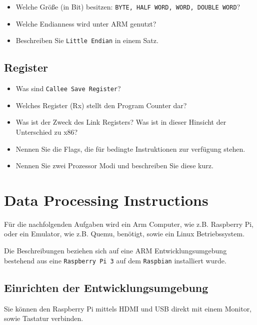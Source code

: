 \documentclass[12pt]{article}
\begin{document}
\begin{itemize}
    \item Welche Größe (in Bit) besitzen: \texttt{BYTE, HALF WORD, WORD, DOUBLE WORD}?
    \item Welche Endianness wird unter ARM genutzt?
    \item Beschreiben Sie \texttt{Little Endian} in einem Satz.
\end{itemize}

\subsection{Register}

\begin{itemize}
    \item Was sind \texttt{Callee Save Register}?
    \item Welches Register (Rx) stellt den Program Counter dar?
    \item Was ist der Zweck des Link Registers? Was ist in dieser Hinsicht der
        Unterschied zu x86?
    \item Nennen Sie die Flags, die für bedingte Instruktionen zur verfügung stehen.
    \item Nennen Sie zwei Prozessor Modi und beschreiben Sie diese kurz.
\end{itemize}

\section{Data Processing Instructions}
Für die nachfolgenden Aufgaben wird ein Arm Computer, wie z.B. Raspberry Pi,
oder ein Emulator, wie z.B. Quemu, benötigt, sowie ein Linux Betriebssystem.

Die Beschreibungen beziehen sich auf eine ARM Entwicklungsumgebung
bestehend aus eine \texttt{Raspberry Pi 3} auf dem \texttt{Raspbian} installiert
wurde.

\subsection{Einrichten der Entwicklungsumgebung}
Sie können den Raspberry Pi mittels HDMI und USB direkt mit einem Monitor, sowie
Tastatur verbinden. 
\end{document}
